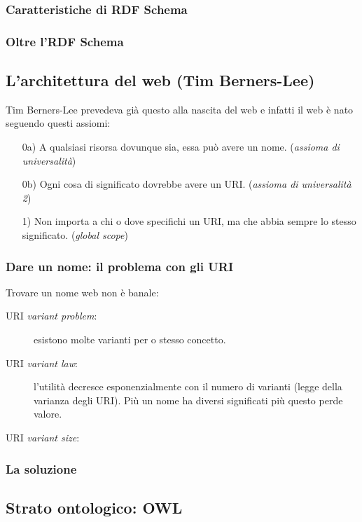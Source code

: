 			\subsubsection{Caratteristiche di RDF Schema}

			\subsubsection{Oltre l'RDF Schema}
			
		\subsection{L'architettura del web (Tim Berners-Lee)}
			Tim Berners-Lee prevedeva già questo alla nascita del web e infatti il web è nato seguendo questi assiomi:
			\begin{itemize}
				\item [0a)] A qualsiasi risorsa dovunque sia, essa può avere un nome. (\emph{assioma di universalità})
				\item [0b)] Ogni cosa di significato dovrebbe avere un URI. (\emph{assioma di universalità 2})
				\item [1)] Non importa a chi o dove specifichi un URI, ma che abbia sempre lo stesso significato. (\emph{global scope})
			\end{itemize}
			
			\subsubsection{Dare un nome: il problema con gli URI}
				Trovare un nome web non è banale:
				\begin{description}
					\item[URI \emph{variant problem}:] esistono molte varianti per o stesso concetto.
					\item[URI \emph{variant law}:] l'utilità decresce esponenzialmente con il numero di varianti (legge della varianza degli URI). Più un nome ha diversi significati più questo perde valore.
					\item[URI \emph{variant size}:]
				\end{description}
			
			\subsubsection{La soluzione}
			
		
		\subsection{Strato ontologico: OWL}
		
